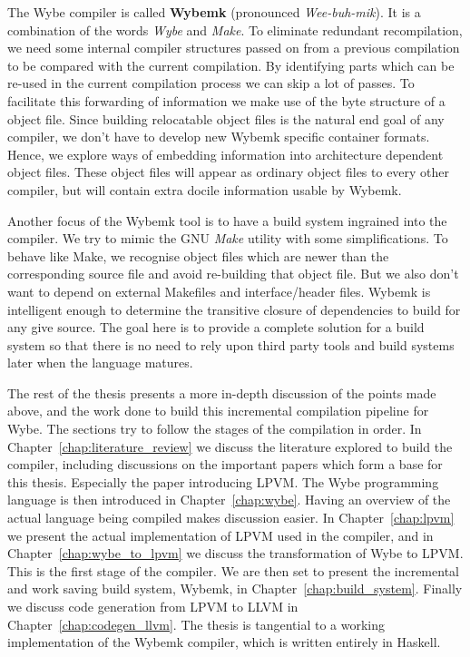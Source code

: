 The Wybe compiler is called \textbf{Wybemk} (pronounced
\textit{Wee-buh-mik}). It is a combination of the words \textit{Wybe} and
\textit{Make}. To eliminate redundant recompilation, we need some internal
compiler structures passed on from a previous compilation to be compared with
the current compilation. By identifying parts which can be re-used in the
current compilation process we can skip a lot of passes. To facilitate this
forwarding of information we make use of the byte structure of a object
file. Since building relocatable object files is the natural end goal of any
compiler, we don't have to develop new Wybemk specific container
formats. Hence, we explore ways of embedding information into architecture
dependent object files. These object files will appear as ordinary object files
to every other compiler, but will contain extra docile information usable by
Wybemk.

Another focus of the Wybemk tool is to have a build system ingrained into the
compiler. We try to mimic the GNU \textit{Make} utility \citep{make} with some
simplifications. To behave like Make, we recognise object files which are newer
than the corresponding source file and avoid re-building that object file. But
we also don't want to depend on external Makefiles and interface/header
files. Wybemk is intelligent enough to determine the transitive closure of
dependencies to build for any give source. The goal here is to provide a
complete solution for a build system so that there is no need to rely upon
third party tools and build systems later when the language matures.


The rest of the thesis presents a more in-depth discussion of the points made
above, and the work done to build this incremental compilation pipeline for
Wybe. The sections try to follow the stages of the compilation in order. In
Chapter~\ref{chap:literature_review} we discuss the literature explored to
build the compiler, including discussions on the important papers which form a
base for this thesis. Especially the paper introducing LPVM. The Wybe
programming language is then introduced in Chapter~\ref{chap:wybe}. Having an
overview of the actual language being compiled makes discussion easier. In
Chapter~\ref{chap:lpvm} we present the actual implementation of LPVM used in
the compiler, and in Chapter~\ref{chap:wybe_to_lpvm} we discuss the
transformation of Wybe to LPVM. This is the first stage of the compiler. We are
then set to present the incremental and work saving build system, Wybemk, in
Chapter~\ref{chap:build_system}. Finally we discuss code generation from LPVM
to LLVM in Chapter~\ref{chap:codegen_llvm}. The thesis is tangential to a
working implementation of the Wybemk compiler, which is written entirely in
Haskell.


